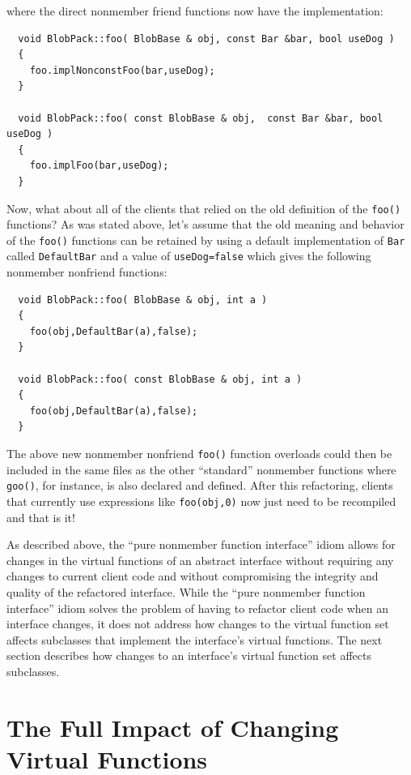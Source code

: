 \documentclass[pdf,ps2pdf,11pt]{SANDreport}
\begin{document}
{}\noindent{}where the direct nonmember friend functions now have the
implementation:

{\small\begin{verbatim}
  void BlobPack::foo( BlobBase & obj, const Bar &bar, bool useDog )
  {
    foo.implNonconstFoo(bar,useDog);
  }

  void BlobPack::foo( const BlobBase & obj,  const Bar &bar, bool useDog )
  {
    foo.implFoo(bar,useDog);
  }
\end{verbatim}}

Now, what about all of the clients that relied on the old definition of the
{}\texttt{foo()} functions?  As was stated above, let's assume that the old
meaning and behavior of the {}\texttt{foo()} functions can be retained by
using a default implementation of {}\texttt{Bar} called {}\texttt{DefaultBar}
and a value of {}\texttt{useDog=false} which gives the following nonmember
nonfriend functions:

{\small\begin{verbatim}
  void BlobPack::foo( BlobBase & obj, int a )
  {
    foo(obj,DefaultBar(a),false);
  }

  void BlobPack::foo( const BlobBase & obj, int a )
  {
    foo(obj,DefaultBar(a),false);
  }
\end{verbatim}}

The above new nonmember nonfriend {}\texttt{foo()} function overloads could
then be included in the same files as the other ``standard'' nonmember
functions where {}\texttt{goo()}, for instance, is also declared and defined.
After this refactoring, clients that currently use expressions like
{}\texttt{foo(obj,0)} now just need to be recompiled and that is it!

As described above, the ``pure nonmember function interface'' idiom allows for
changes in the virtual functions of an abstract interface without requiring
any changes to current client code and without compromising the integrity and
quality of the refactored interface.  While the ``pure nonmember function
interface'' idiom solves the problem of having to refactor client code when an
interface changes, it does not address how changes to the virtual function set
affects subclasses that implement the interface's virtual functions.  The next
section describes how changes to an interface's virtual function set affects
subclasses.

%
\section{The Full Impact of Changing Virtual Functions}
%
\end{document}
